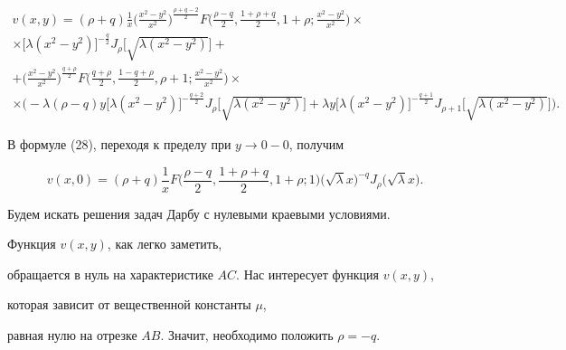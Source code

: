 \begin{multline}


v(x,y)=


(\rho+q)\frac{1}{x}\bigg(\frac{x^2-y^2}{x^2}\bigg)^{{\frac{\rho+q-2}{2}}}


F\bigg(\frac{\rho-q}{2},\frac{1+\rho+q}{2},1+\rho;


\frac{x^2-y^2}{x^2}\bigg)\times \\


%


\times\big[\lambda (x^2-y^2)\big]^{{-\frac{q}{2}}}


J_\rho\big[\sqrt{\lambda (x^2-y^2)}\big]+ \\


%


+\bigg(\frac{x^2-y^2}{x^2}\bigg)^{{\frac{q+\rho}{2}}}


F\bigg(\frac{q+\rho}{2},\frac{1-q+\rho}{2},\rho+1;


\frac{x^2-y^2}{x^2}\bigg)\times \\


%


\times \big(-\lambda(\rho-q)y\big[\lambda (x^2-y^2)\big]^{{-\frac{q+2}{2}}}


J_\rho\big[\sqrt{\lambda (x^2-y^2)}\big] +


\lambda y\big[\lambda (x^2-y^2)\big]^{{-\frac{q+1}{2}}}


J_{\rho+1}\big[\sqrt{\lambda (x^2-y^2)}\big]\big).


\end{multline}


В формуле (28), переходя к пределу при $y \to 0-0$, получим


$$


v(x,0) = (\rho+q)\frac{1}{x}F\bigg(\frac{\rho-q}{2},\frac{1+\rho+q}{2},


1+\rho;1\bigg)\big(\sqrt{\lambda}x\big)^{{-q}}


J_\rho\big(\sqrt{\lambda}x\big).


$$





Будем искать решения задач Дарбу с нулевыми краевыми условиями.


Функция $v(x,y)$, как легко заметить,


обращается в нуль на характеристике $AC.$ Нас интересует функция $v(x,y)$,


которая зависит от вещественной константы $\mu$,


равная нулю на отрезке $AB.$ Значит, необходимо положить $\rho =-q.$


